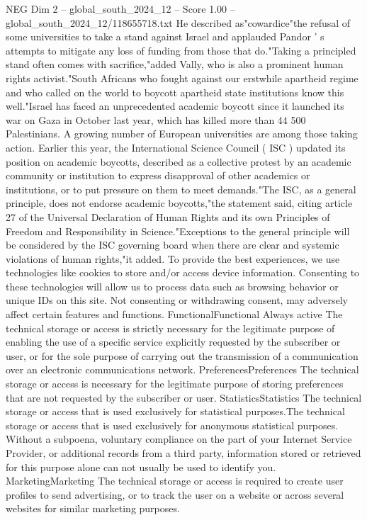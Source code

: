 \begin{textsample}{NEG Dim 2 – global\_south\_2024\_12 – Score 1.00 – global\_south\_2024\_12/118655718.txt}
He described as"cowardice"the refusal of some universities to take a stand against Israel and applauded Pandor ' s attempts to mitigate any loss of funding from those that do."Taking a principled stand often comes with sacrifice,"added Vally, who is also a prominent human rights activist."South Africans who fought against our erstwhile apartheid regime and who called on the world to boycott apartheid state institutions know this well."Israel has faced an unprecedented academic boycott since it launched its war on Gaza in October last year, which has killed more than 44 500 Palestinians.
A growing number of European universities are among those taking action.
Earlier this year, the International Science Council ( ISC ) updated its position on academic boycotts, described as a collective protest by an academic community or institution to express disapproval of other academics or institutions, or to put pressure on them to meet demands."The ISC, as a general principle, does not endorse academic boycotts,"the statement said, citing article 27 of the Universal Declaration of Human Rights and its own Principles of Freedom and Responsibility in Science."Exceptions to the general principle will be considered by the ISC governing board when there are clear and systemic violations of human rights,"it added.
To provide the best experiences, we use technologies like cookies to store and/or access device information.
Consenting to these technologies will allow us to process data such as browsing behavior or unique IDs on this site.
Not consenting or withdrawing consent, may adversely affect certain features and functions.
FunctionalFunctional Always active The technical storage or access is strictly necessary for the legitimate purpose of enabling the use of a specific service explicitly requested by the subscriber or user, or for the sole purpose of carrying out the transmission of a communication over an electronic communications network.
PreferencesPreferences The technical storage or access is necessary for the legitimate purpose of storing preferences that are not requested by the subscriber or user.
StatisticsStatistics The technical storage or access that is used exclusively for statistical purposes.The technical storage or access that is used exclusively for anonymous statistical purposes.
Without a subpoena, voluntary compliance on the part of your Internet Service Provider, or additional records from a third party, information stored or retrieved for this purpose alone can not usually be used to identify you.
MarketingMarketing The technical storage or access is required to create user profiles to send advertising, or to track the user on a website or across several websites for similar marketing purposes.

\end{textsample}
